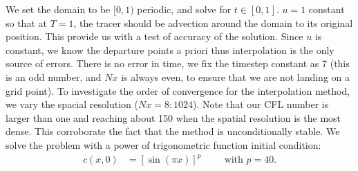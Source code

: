 \documentclass[11pt,letterpaper]{article}
\begin{document}
We set the domain to be $[0,1)$ periodic, and solve for $t\in [0,1]$. $u = 1$ constant so that at $T = 1$, the tracer should be advection around the domain to its original position. This provide us with a test of accuracy of the solution. Since $u$ is constant, we know the departure points a priori thus interpolation is the only source of errors. There is no error in time, we fix the timestep constant as 7 (this is an odd number, and $Nx$ is always even, to ensure that we are not landing on a grid point). To investigate the order of convergence for the interpolation method, we vary the spacial resolution ($Nx = 8:1024$). Note that our CFL number is larger than one and reaching about 150 when the spatial resolution is the most dense. This corroborate the fact that the \sml\;method is unconditionally stable. We solve the problem with a power of trigonometric function initial condition:
\begin{align*}
    c(x,0) &= [\sin(\pi x)]^p \hspace{1cm}\text{with }p = 40.
\end{align*}
\end{document}
